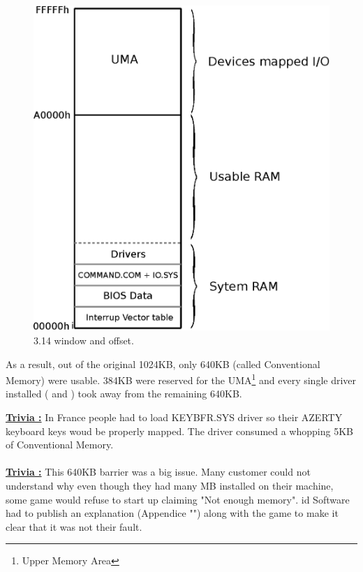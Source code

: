 \documentclass[book.tex]{subfiles}
\begin{document}
\begin{figure}[H]
\centering
\includegraphics[scale=1]{imgs/real_mode}

\caption{3.14 window and offset.}
\label{fig:fp_internals}
\end{figure}


As a result, out of the original 1024KB, only 640KB (called Conventional Memory) were usable. 384KB were reserved for the UMA\footnote{Upper Memory Area} and every single driver installed ( and )  took away from the remaining 640KB.

\bigskip

\textbf{\underline{Trivia :}}  In France people had to load KEYBFR.SYS driver so their AZERTY keyboard keys woud be properly mapped. The driver consumed a whopping 5KB of Conventional Memory.\\
\\
\textbf{\underline{Trivia :}}  This 640KB barrier was a big issue. Many customer could not understand why even though they had many MB installed on their machine, some game would refuse to start up claiming "Not enough memory". id Software had to publish an explanation (Appendice "") along with the game to make it clear that it was not their fault.
\end{document}
